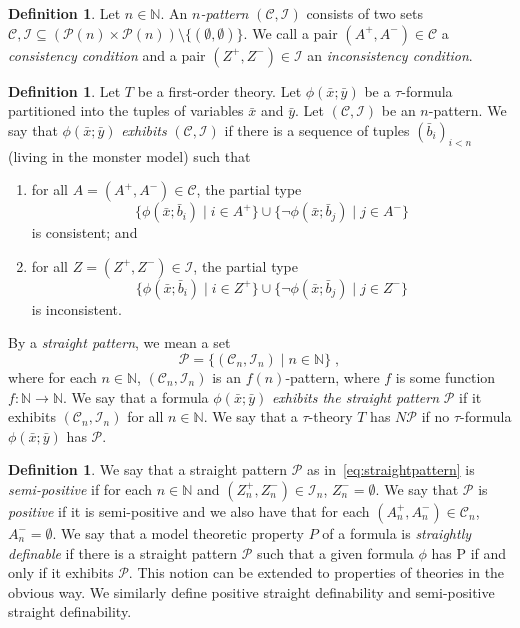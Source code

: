 \documentclass{amsart}
\theoremstyle{definition}
\newtheorem{definition}[theorem]{Definition}
\theoremstyle{remark}
\numberwithin{equation}{section}
\begin{document}
\begin{definition}\label{def:patternedprop} Let $n\in\mathbb{N}$. An ${n}$\emph{-pattern} $(\mathcal{C}, \mathcal{I})$ consists of two sets $\mathcal{C}, \mathcal{I}\subseteq(\mathcal{P}(n)\times\mathcal{P}(n))\setminus\{(\emptyset,\emptyset)\} $. We call a pair $(A^+, A^-)\in\mathcal{C}$ a \emph{consistency condition} and a pair $(Z^+, Z^-)\in\mathcal{I}$ an \emph{inconsistency condition}.
\end{definition}
\begin{definition} Let $T$ be a first-order theory. Let $\phi(\bar{x};\bar{y})$ be a $\tau$-formula partitioned into the tuples of variables $\bar{x}$ and $\bar{y}$. Let $(\mathcal{C}, \mathcal{I})$ be an $n$-pattern. We say that $\phi(\bar{x};\bar{y})$ \emph{exhibits} $(\mathcal{C}, \mathcal{I})$ if there is a sequence of tuples $(\bar{b}_i)_{i<n}$ (living in the monster model) such that 
\begin{enumerate}
    \item for all $A=(A^+, A^-)\in\mathcal{C}$, the partial type
    \[\{\phi(\bar{x};\bar{b}_i)\mid i\in A^+\}\cup\{\neg\phi(\bar{x};\bar{b}_j)\mid j\in A^-\}\]
    is consistent; and
    \item for all $Z=(Z^+, Z^-)\in\mathcal{I}$, the partial type
    \[\{\phi(\bar{x};\bar{b}_i)\mid i\in Z^+\}\cup\{\neg\phi(\bar{x};\bar{b}_j)\mid j\in Z^-\}\]
    is inconsistent.
\end{enumerate}
 By a \emph{straight pattern},
 we mean a set
 \begin{equation}\label{eq:straightpattern}
    \mathcal{P}=\{(\mathcal{C}_n, \mathcal{I}_n) \mid n\in\mathbb{N}\}\;, 
 \end{equation}
    where for each $n\in\mathbb{N}$, $(\mathcal{C}_n, \mathcal{I}_n)$ is an $f(n)$-pattern, where $f$ is some function $f \colon \mathbb{N}\to\mathbb{N}$. We say that a formula $\phi(\bar{x};\bar{y})$ \emph{exhibits the straight pattern} $\mathcal{P}$ if it exhibits $(\mathcal{C}_n, \mathcal{I}_n)$ for all $n\in\mathbb{N}$. We say that a $\tau$-theory $T$ has $N\mathcal{P}$ if no $\tau$-formula $\phi(\bar{x};\bar{y})$ has $\mathcal{P}$. 
\end{definition}

\begin{definition}\label{def:semipositive}
	We say that a straight pattern $\mathcal{P}$ as in~\ref{eq:straightpattern} is \emph{semi-positive} if for each $n\in\mathbb{N}$ and $(Z_n^+, Z_n^{-})\in \mathcal{I}_n$, $Z_n^{-}=\emptyset$. We say that $\mathcal{P}$ is \emph{positive} if it is semi-positive and we also have that for each $(A_n^+, A_n^{-})\in \mathcal{C}_n$, $A_n^{-}=\emptyset$. We say that a model theoretic property $P$ of a formula is \emph{straightly definable} if there is a straight pattern $\mathcal{P}$ such that a given formula $\phi$ has P if and only if it exhibits $\mathcal{P}$.
This notion can be extended to properties of theories in the obvious way. We similarly define positive straight definability and semi-positive straight definability.
\end{definition}
\end{document}

